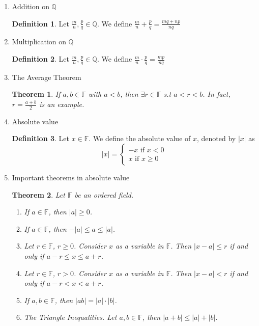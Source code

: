 \documentclass{article}
\theoremstyle{claim}
\newtheorem{theorem}{Theorem}[section]
\theoremstyle{definition}
\newtheorem{definition}{Definition}
\begin{document}
\begin{enumerate}
    \item[13.] Addition on $\mathbb{Q}$  
        \begin{definition}
            Let $\frac{m}{n}, \frac{p}{q} \in \mathbb{Q}$. We define $\frac{m}{n} + \frac{p}{q} = \frac{mq + np}{nq}$
        \end{definition}

    \item[14.] Multiplication on $\mathbb{Q}$
        \begin{definition}
            Let $\frac{m}{n}, \frac{p}{q} \in \mathbb{Q}$. We define $\frac{m}{n} \cdot \frac{p}{q} = \frac{mp}{nq}$
        \end{definition}

    \item[15.] The Average Theorem
        \begin{theorem}
            If $a, b \in \mathbb{F}$ with $a < b$, then $\exists r \in \mathbb{F}$ s.t $a < r < b$. In fact, $r = \frac{a + b}{2}$ is an example.
        \end{theorem}

    \item[16.] Absolute value
        \begin{definition}
            Let $x \in \mathbb{F}$. We define the absolute value of $x$, denoted by $|x|$ as
            \begin{equation*}
                |x| = \left\{
                    \begin{array}{rl}
                        -x \text{ if } x < 0\\
                        x \text{ if } x \ge 0
                    \end{array} \right.
            \end{equation*}
        \end{definition}

    \item[17.] Important theorems in absolute value
        \begin{theorem}
            Let $\mathbb{F}$ be an ordered field.
            \begin{enumerate}
                \item[1.] If $a \in \mathbb{F}$, then $|a| \ge 0$.
                \item[2.] If $a \in \mathbb{F}$, then $-|a| \le a \le |a|$.
                \item[3.] Let $r \in \mathbb{F}$, $r \ge 0$. Consider $x$ as a variable in $\mathbb{F}$. Then $|x - a| \le r$ if and only if $a - r \le x \le a + r$.  
                \item[4.] Let $r \in \mathbb{F}$, $r > 0$. Consider $x$ as a variable in $\mathbb{F}$. Then $|x - a| < r$ if and only if $a - r < x < a + r$.
                \item[5.] If $a, b \in \mathbb{F}$, then $|ab| = |a| \cdot |b|$.
                \item[6.] \emph{The Triangle Inequalities.} Let $a, b \in \mathbb{F}$, then $|a + b| \le |a| + |b|$.
            \end{enumerate}
        \end{theorem}


\end{enumerate}
\end{document}
